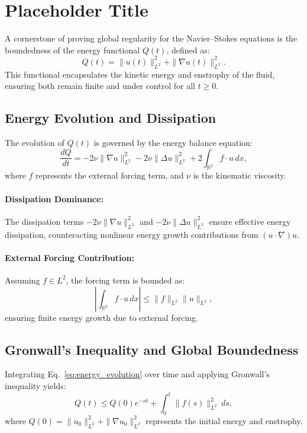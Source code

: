 \section{Placeholder Title}

A cornerstone of proving global regularity for the Navier--Stokes equations is the boundedness of the energy functional $Q(t)$, defined as:
\begin{equation}
Q(t) = \|u(t)\|_{L^2}^2 + \|\nabla u(t)\|_{L^2}^2.
\label{eq:qt_definition}
\end{equation}
This functional encapsulates the kinetic energy and enstrophy of the fluid, ensuring both remain finite and under control for all $t \geq 0$.

\subsection{Energy Evolution and Dissipation}
The evolution of $Q(t)$ is governed by the energy balance equation:
\begin{equation}
\frac{dQ}{dt} = -2\nu \|\nabla u\|_{L^2}^2 - 2\nu \|\Delta u\|_{L^2}^2 + 2 \int_{\mathbb{R}^3} f \cdot u \, dx,
\label{eq:energy_evolution}
\end{equation}
where $f$ represents the external forcing term, and $\nu$ is the kinematic viscosity.

\paragraph{Dissipation Dominance:}
The dissipation terms $-2\nu \|\nabla u\|_{L^2}^2$ and $-2\nu \|\Delta u\|_{L^2}^2$ ensure effective energy dissipation, counteracting nonlinear energy growth contributions from $(u \cdot \nabla)u$.

\paragraph{External Forcing Contribution:}
Assuming $f \in L^2$, the forcing term is bounded as:
\begin{equation}
\left| \int_{\mathbb{R}^3} f \cdot u \, dx \right| \leq \|f\|_{L^2} \|u\|_{L^2},
\end{equation}
ensuring finite energy growth due to external forcing.

\subsection{Gronwall’s Inequality and Global Boundedness}
Integrating Eq.~\eqref{eq:energy_evolution} over time and applying Gronwall’s inequality yields:
\begin{equation}
Q(t) \leq Q(0) e^{-\nu t} + \int_0^t \|f(s)\|_{L^2}^2 \, ds,
\label{eq:qt_boundedness}
\end{equation}
where $Q(0) = \|u_0\|_{L^2}^2 + \|\nabla u_0\|_{L^2}^2$ represents the initial energy and enstrophy.

